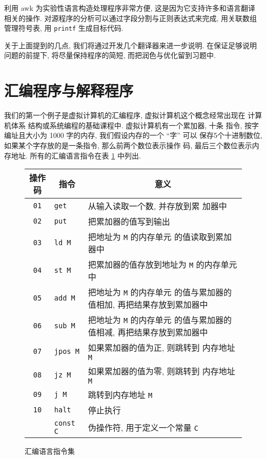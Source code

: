 利用 awk 为实验性语言构造处理程序非常方便, 这是因为它支持许多和语言翻译
相关的操作. 对源程序的分析可以通过字段分割与正则表达式来完成, 用关联数组
管理符号表, 用 \texttt{printf} 生成目标代码.

关于上面提到的几点, 我们将通过开发几个翻译器来进一步说明. 在保证足够说明
问题的前提下,  将尽量保持程序的简短, 而把润色与优化留到习题中.

\section{汇编程序与解释程序}
\label{subsec:an_assembler_and_interpreter}

我们的第一个例子是虚拟计算机的汇编程序, 虚拟计算机这个概念经常出现在
计算机体系 结构或系统编程的基础课程中. 虚拟计算机有一个累加器, 十条
指令, 按字编址且大小为 1000 字的内存, 我们假设内存的一个 ``字'' 可以
保存5个十进制数位, 如果某个字存放的是一条指令, 那么前两个数位表示操作
码, 最后三个数位表示内存地址. 所有的汇编语言指令在表
\ref{tbl:assembly_language_instructions} 中列出.
\begin{figure}[ht]
\captionsetup{type=table}
\caption{汇编语言指令集}
\label{tbl:assembly_language_instructions}
\begin{center}
    \begin{tabular}{c|l|l}
        \hline
        \hline
        \multicolumn{1}{c|}{操作码}          & \multicolumn{1}{c|}{指令}    &
        \multicolumn{1}{c}{意义}  \\
        \hline
        \texttt{01}     & \texttt{get}  & 从输入读取一个数, 并存放到累
        加器中 \\
        \texttt{02}     & \texttt{put}  & 把累加器的值写到输出 \\
        \texttt{03}     & \texttt{ld M}  & 把地址为 \texttt{M} 的内存单元
        的值读取到累加器中 \\
        \texttt{04}     & \texttt{st M}  & 把累加器的值存放到地址为 
        \texttt{M} 的内存单元中 \\
        \texttt{05}     & \texttt{add M} & 把地址为 \texttt{M} 的内存单元 
        的值与累加器的值相加, 再把结果存放到累加器中 \\
        \texttt{06}     & \texttt{sub M} & 把地址为 \texttt{M} 的内存单元 
        的值与累加器的值相减, 再把结果存放到累加器中 \\
        \texttt{07}     & \texttt{jpos M} & 如果累加器的值为正, 则跳转到
        内存地址 \texttt{M} \\
        \texttt{08}     & \texttt{jz M} & 如果累加器的值为零, 则跳转到 
        内存地址 \texttt{M}     \\
        \texttt{09}     & \texttt{j M}  & 跳转到内存地址 \texttt{M} \\
        \texttt{10}     & \texttt{halt} & 停止执行 \\
                        & \texttt{const C} & 伪操作符, 用于定义一个常量
                        \texttt{C} \\
        \hline
    \end{tabular}
\end{center}
\end{figure}

